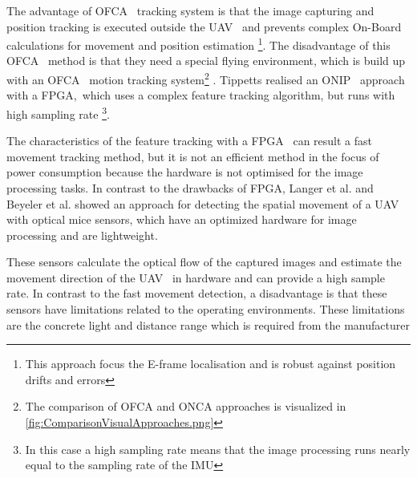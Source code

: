 The advantage of \gls{OFCA}~ tracking system is that the image capturing and position
tracking is executed outside the \gls{UAV}~ and prevents complex On-Board
calculations for movement and position estimation \footnote{This approach focus the E-frame
localisation and is robust against position drifts and errors}.
\newpage
The disadvantage of this \gls{OFCA}~ method is that they need a special flying environment, which is
build up with an \gls{OFCA}~ motion tracking system\footnote{The comparison of \gls{OFCA}
and \gls{ONCA} approaches is visualized in \ref{fig:ComparisonVisualApproaches.png}}
. Tippetts 
realised an \gls{ONIP}~ approach with a \gls{FPGA},~which uses a complex feature tracking
algorithm, but runs with high sampling rate \footnote{In this case a high sampling
rate means that the image processing runs nearly equal to the sampling rate of
the \gls{IMU}}. 

The characteristics of the feature tracking with a \gls{FPGA}~ can result
a fast movement tracking method, but it is not an efficient method in the focus
of power consumption because the hardware is not optimised for the image
processing tasks.
In contrast to the drawbacks of \gls{FPGA}, Langer et al.  and Beyeler et al.
 showed an approach for detecting the spatial
movement of a \gls{UAV}~ with optical mice sensors, which have an optimized  hardware
for image processing and are lightweight.

These sensors calculate the optical
flow of the captured images and estimate the movement direction of the \gls{UAV}~ in
hardware and can provide a high sample rate. In contrast to the fast movement
detection, a disadvantage is that these sensors have limitations related to the
operating environments. These limitations are the concrete light and distance
range which is required from the manufacturer 

